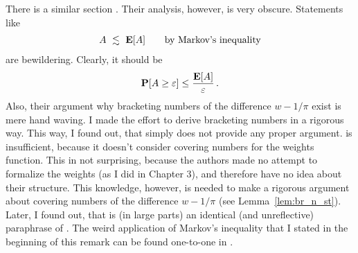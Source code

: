 \begin{remark}
  There is a similar section \cite[page 27-28]{Wang2019}.
  Their analysis, however, is very obscure. Statements like
  \begin{align*}
    A\ \lesssim\  \mathbf{E}[A] \qquad
    \text{by Markov's inequality}
  \end{align*}
  are bewildering. Clearly, it should be
  \begin{align*}
    \mathbf{P}[A\ge \varepsilon]\le \frac
    {\mathbf{E}[A]}
    {\varepsilon}
    \,.
  \end{align*}
  Also, their argument why bracketing numbers of the difference $w-1/\pi$ exist is mere hand waving. 
  I made the effort to derive bracketing numbers in a rigorous way. This way, I found out, that \cite{Wang2019} simply does not provide any proper argument. \cite[Assumption~2.4]{Wang2019} is insufficient, because it doesn't consider covering numbers for the weights function.
  This in not surprising, because the authors made no attempt to formalize the weights (as I did in Chapter 3), and therefore have no idea about their structure. 
  This knowledge, however, is needed to make a rigorous argument about covering numbers of the difference $w-1/\pi$ (see Lemma~\ref{lem:br_n_st}).
  Later, I found out, that \cite[Proof of Theorem~3]{Wang2019} is (in large parts) an identical (and unreflective) paraphrase of \cite{Fan}. The weird application of Markov's inequality that I stated in the beginning of this remark can be found one-to-one in \cite[page~46]{Fan}.
\end{remark}


